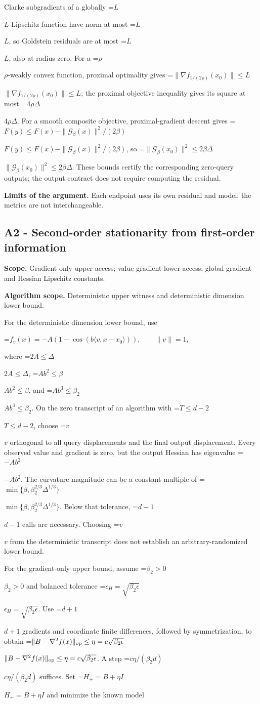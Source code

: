 \documentclass[10pt,a4paper]{article}
\newcommand{\AtlasMath}[1]{\par\begingroup\centering\setbox0=\hbox{$\displaystyle #1$}\ifdim\wd0>1.4\linewidth\typeout{ATLAS WIDE FORMULA: \the\wd0}\fi\ifdim\wd0>\linewidth\resizebox{\linewidth}{!}{\box0}\else\box0\fi\par\endgroup}
\newcommand{\AtlasInlineMath}[1]{\begingroup\setbox0=\hbox{$#1$}\ifdim\wd0>.4\linewidth\endgroup\AtlasMath{#1}\else\endgroup$#1$\fi}
\begin{document}
Clarke subgradients of a globally \AtlasInlineMath{L}-Lipschitz function have norm at most \AtlasInlineMath{L}, so Goldstein residuals are at most \AtlasInlineMath{L}, also at radius zero. For a \AtlasInlineMath{\rho}-weakly convex function, proximal optimality gives
\AtlasInlineMath{\|\nabla f_{1/(2\rho)}(x_0)\|\le L}; the proximal objective inequality gives its square at most \AtlasInlineMath{4\rho\Delta}.
For a smooth composite objective, proximal-gradient descent gives
\AtlasInlineMath{F(y)\le F(x)-\|\mathcal G_\beta(x)\|^2/(2\beta)},
so \AtlasInlineMath{\|\mathcal G_\beta(x_0)\|^2\le2\beta\Delta}.
These bounds certify the corresponding zero-query outputs; the output contract does not require computing the residual.

\textbf{Limits of the argument.} Each endpoint uses its own residual and model; the metrics are not interchangeable.

\subsection{A2 - Second-order stationarity from first-order information}
\textbf{Scope.} Gradient-only upper access; value-gradient lower access; global gradient and Hessian Lipschitz constants.

\textbf{Algorithm scope.} Deterministic upper witness and deterministic dimension lower bound.

For the deterministic dimension lower bound, use

\AtlasMath{f_v(x)=-A(1-\cos(b\langle v,x-x_0\rangle)),\qquad\|v\|=1,}

where \AtlasInlineMath{2A\le\Delta}, \AtlasInlineMath{Ab^2\le\beta}, and \AtlasInlineMath{Ab^3\le\beta_2}. On the zero transcript of an algorithm with \AtlasInlineMath{T\le d-2}, choose \AtlasInlineMath{v} orthogonal to all query displacements and the final output displacement. Every observed value and gradient is zero, but the output Hessian has eigenvalue \AtlasInlineMath{-Ab^2}. The curvature magnitude can be a constant multiple of \AtlasInlineMath{\min\{\beta,\beta_2^{2/3}\Delta^{1/3}\}}. Below that tolerance, \AtlasInlineMath{d-1} calls are necessary. Choosing \AtlasInlineMath{v} from the deterministic transcript does not establish an arbitrary-randomized lower bound.

For the gradient-only upper bound, assume \AtlasInlineMath{\beta_2>0} and balanced tolerance \AtlasInlineMath{\epsilon_H=\sqrt{\beta_2\epsilon}}. Use \AtlasInlineMath{d+1} gradients and coordinate finite differences, followed by symmetrization, to obtain
\AtlasInlineMath{\|B-\nabla^2f(x)\|_{\rm op}\le\eta=c\sqrt{\beta_2\epsilon}}.
A step \AtlasInlineMath{c\eta/(\beta_2d)} suffices. Set \AtlasInlineMath{H_+=B+\eta I} and minimize the known model
\end{document}
